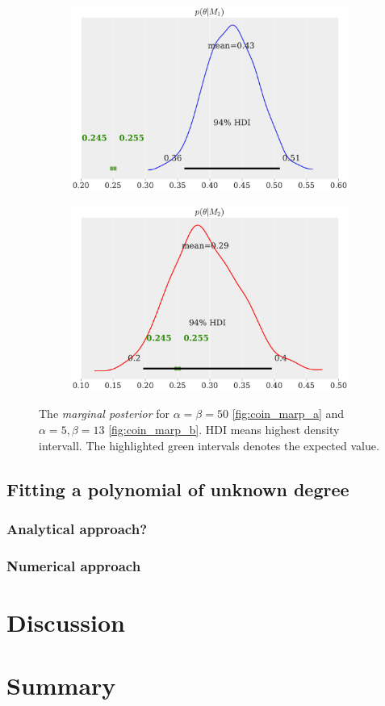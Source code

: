 \documentclass[%
 reprint,
 amsmath,amssymb,
 aps,
]{revtex4-1}
\begin{document}
\begin{figure}
	\begin{subfigure}{\linewidth}
		\includegraphics[width=\linewidth]{coin_marp_m1.pdf}
		\subcaption{}\label{fig:coin_marp_a}
	\end{subfigure}
	\begin{subfigure}{\linewidth}
		\includegraphics[width=\linewidth]{coin_marp_m2.pdf}
		\subcaption{}\label{fig:coin_marp_b}
	\end{subfigure}
	\caption{The \emph{marginal posterior} for $\alpha=\beta=50$ \eqref{fig:coin_marp_a} and $\alpha=5, \beta=13$ \eqref{fig:coin_marp_b}. HDI means highest density intervall. The highlighted green intervals denotes the expected value.}\label{fig:coin_marp}
\end{figure}
\subsection{Fitting a polynomial of unknown degree}
\subsubsection{Analytical approach?}
\subsubsection{Numerical approach}

\section{Discussion}

\section{Summary}

\newpage


\end{document}

